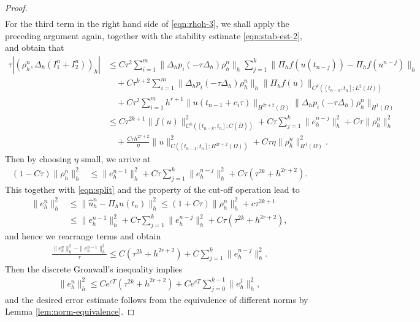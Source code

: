\documentclass[10pt,final,leqno,onefignum,onetabnum]{siamltex}%
\def\II{(\Omega)}
\begin{document}
\begin{proof}
\begin{equation}
\begin{split}
\end{split}
 \end{equation}
For the third term in the right hand side of \eqref{eqn:rhoh-3}, we shall apply the preceding argument again, together with the stability estimate
\eqref{eqn:stab-est-2}, and obtain that
\begin{equation}\label{eqn:fully-I3}
\begin{split}
\tau |( \rho_h^n,\Delta_h (I_1^n+I_2^n))_h| &\le  C \tau^2 \sum_{i=1}^m \|\Delta_h p_i(-\tau \Delta_h)\rho_h^n \|_h  \sum_{j=1}^k  \|\Pi_hf(u(t_{n-j}))- \Pi_h f(u^{n-j})\|_h   \\
     &\quad+  C \tau^{k+2} \sum_{i=1}^m  \| \Delta_hp_i(-\tau \Delta_h)\rho_h^n \|_h  \|  \Pi_h f(u)  \|_{C^{k}([t_{n-k},t_n]; L^2\II)} \\
&\quad+ C\tau^2 \sum_{i=1}^m h^{r+1} \| u(t_{n-1}+c_i\tau)  \|_{H^{2r+2}(\Omega)} \| \Delta_h p_i(-\tau\Delta_h) \rho_h^n \|_{H^1\II} \\
 &\le C\tau^{2k+1} \|  f(u)  \|_{C^{k}([t_{n-k},t_n]; C(\bar\Omega))}^2 + C \tau \sum_{j=1}^k \|  e_h^{n-j}  \|_h^2 +  C\tau \|  \rho_h^n \|_h^2\\
&\quad+\frac{C \tau h^{2r+2}}{\eta}  \| u  \|_{C([t_{n-1},t_n];H^{2r+2}(\Omega))}^2 + C\tau \eta  \| \rho_h^n \|_{H^1\II}^2.
\end{split}
 \end{equation}
Then by choosing $\eta$ small, we arrive at
\begin{align*}
(1-C\tau) \| \rho_h^n \|_h^2 &\le  \|  e_h^{n-1} \|_h^2   + C \tau \sum_{j=1}^k  \|  e_h^{n-j} \|_h^2
+ C\tau (\tau^{2k} + h^{2r+2}).
\end{align*}
This together with \eqref{eqn:split} and the property of the cut-off operation lead to
\begin{align*}
\| e_h^n  \|_h^2 &\le \| \hat u_h^n - \Pi_h u(t_n) \|_h^2   \le (1+C\tau) \| \rho_h^n \|_h^2 + c\tau^{2k+1}\\
&\le\| e_h^{n-1}  \|_h^2 + C \tau \sum_{j=1}^k  \|  e_h^{n-j} \|_h^2  + C\tau (\tau^{2k} + h^{2r+2}),
\end{align*}
and hence we rearrange terms and obtain
\begin{align*}
\frac{\|  e_h^n \|_h^2 -  \|  e_h^{n-1} \|_h^2 }{\tau} \le  C (\tau^{2k} + h^{2r+2})  + C  \sum_{j=1}^k \|  e_h^{n-j}  \|_h^2.
\end{align*}
Then the discrete Gronwall's inequality implies
\begin{align*}
\|  e_h^n \|_h^2  \le  C e^{cT} (\tau^{2k}+h^{2r+2})  + C e^{cT}  \sum_{j=0}^{k-1} \|  e_h^{j}  \|_h^2,
\end{align*}
and the desired error estimate follows from the equivalence of different norms by Lemma \ref{lem:norm-equivalence}.
\end{proof}
\end{document}
